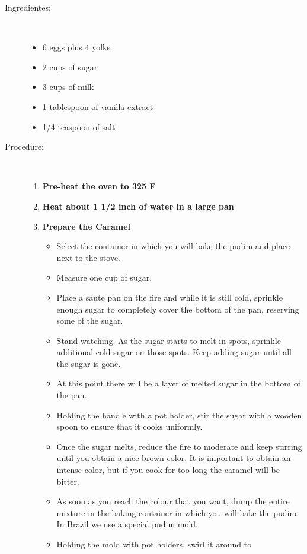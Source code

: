 \documentclass [11pt, letterpaper] {article}
\begin{document}
\begin{description}

\item[Ingredientes:]\ \\
	\begin{itemize}
	\item 6 eggs plus 4 yolks
	\item 2 cups of sugar 
	\item 3 cups of milk
	\item 1 tablespoon of vanilla extract
	\item 1/4 teaspoon of salt
	\end{itemize}

\item[Procedure:] \ \\
	\begin{enumerate}
	\item {\bf Pre-heat the oven to 325 F}
	\item {\bf Heat about 1 1/2 inch of water in a large pan}
	\item {\bf Prepare the Caramel}
	\begin{itemize}
	\item Select the container in which you will bake the pudim and place
next to the stove.
	\item Measure one cup of sugar.
	\item Place a saute pan on the fire and while it is still
cold, sprinkle enough sugar to completely cover the bottom of the pan, reserving some of the sugar.
	\item Stand watching. As the sugar starts to melt in spots,
sprinkle additional cold sugar on those spots. Keep adding sugar until
all the sugar is gone.
	\item At this point there will be a layer of melted sugar in
the bottom of the pan. 
	\item Holding the handle with a pot holder, stir the sugar
with a wooden spoon to ensure that it cooks uniformly.
	\item Once the sugar melts, reduce the fire to moderate and
keep stirring until you obtain a nice brown color. It is important to
obtain  an intense color, but if you cook for too long the caramel will be
bitter.
	\item As soon as you reach the colour that you want, dump the
entire mixture in the baking container in which you will bake the pudim. In Brazil we use a special pudim mold.
	\item Holding the mold with pot holders, swirl it around to

\end{itemize}
\end{enumerate}
\end{description}
\end{document}
